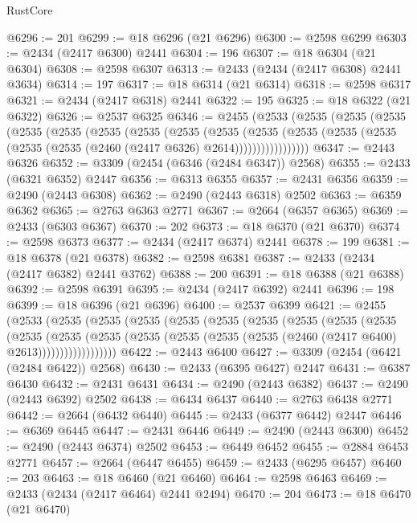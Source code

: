 \begin{lexlean}{RustCore}
\begin{coremodule}
@6296 := 201
@6299 := @18 @6296 (@21 @6296)
@6300 := @2598 @6299
@6303 := @2434 (@2417 @6300) @2441
@6304 := 196
@6307 := @18 @6304 (@21 @6304)
@6308 := @2598 @6307
@6313 := @2433 (@2434 (@2417 @6308) @2441 @3634)
@6314 := 197
@6317 := @18 @6314 (@21 @6314)
@6318 := @2598 @6317
@6321 := @2434 (@2417 @6318) @2441
@6322 := 195
@6325 := @18 @6322 (@21 @6322)
@6326 := @2537 @6325
@6346 := @2455
    (@2533
      (@2535
        (@2535
          (@2535
            (@2535
              (@2535
                (@2535
                  (@2535
                    (@2535
                      (@2535
                        (@2535
                          (@2535
                            (@2535 (@2535 (@2535 (@2535 (@2460 (@2417 @6326) @2614)))))))))))))))))
@6347 := @2443 @6326
@6352 := @3309 (@2454 (@6346 (@2484 @6347)) @2568)
@6355 := @2433 (@6321 @6352) @2447
@6356 := @6313 @6355
@6357 := @2431 @6356
@6359 := @2490 (@2443 @6308)
@6362 := @2490 (@2443 @6318) @2502
@6363 := @6359 @6362
@6365 := @2763 @6363 @2771
@6367 := @2664 (@6357 @6365)
@6369 := @2433 (@6303 @6367)
@6370 := 202
@6373 := @18 @6370 (@21 @6370)
@6374 := @2598 @6373
@6377 := @2434 (@2417 @6374) @2441
@6378 := 199
@6381 := @18 @6378 (@21 @6378)
@6382 := @2598 @6381
@6387 := @2433 (@2434 (@2417 @6382) @2441 @3762)
@6388 := 200
@6391 := @18 @6388 (@21 @6388)
@6392 := @2598 @6391
@6395 := @2434 (@2417 @6392) @2441
@6396 := 198
@6399 := @18 @6396 (@21 @6396)
@6400 := @2537 @6399
@6421 := @2455
    (@2533
      (@2535
        (@2535
          (@2535
            (@2535
              (@2535
                (@2535
                  (@2535
                    (@2535
                      (@2535
                        (@2535
                          (@2535
                            (@2535
                              (@2535
                                (@2535 (@2535 (@2535 (@2460 (@2417 @6400) @2613))))))))))))))))))
@6422 := @2443 @6400
@6427 := @3309 (@2454 (@6421 (@2484 @6422)) @2568)
@6430 := @2433 (@6395 @6427) @2447
@6431 := @6387 @6430
@6432 := @2431 @6431
@6434 := @2490 (@2443 @6382)
@6437 := @2490 (@2443 @6392) @2502
@6438 := @6434 @6437
@6440 := @2763 @6438 @2771
@6442 := @2664 (@6432 @6440)
@6445 := @2433 (@6377 @6442) @2447
@6446 := @6369 @6445
@6447 := @2431 @6446
@6449 := @2490 (@2443 @6300)
@6452 := @2490 (@2443 @6374) @2502
@6453 := @6449 @6452
@6455 := @2884 @6453 @2771
@6457 := @2664 (@6447 @6455)
@6459 := @2433 (@6295 @6457)
@6460 := 203
@6463 := @18 @6460 (@21 @6460)
@6464 := @2598 @6463
@6469 := @2433 (@2434 (@2417 @6464) @2441 @2494)
@6470 := 204
@6473 := @18 @6470 (@21 @6470)

\end{coremodule}
\end{lexlean}
